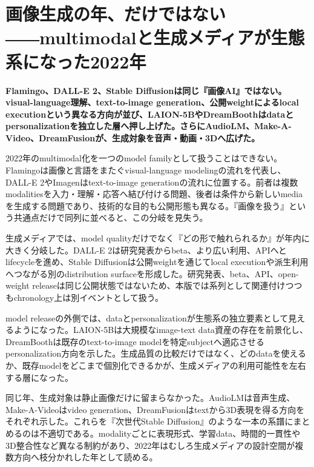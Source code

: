 \section{画像生成の年、だけではない――multimodalと生成メディアが生態系になった2022年}
\label{pkg:multimodal-media}
\noindent\textbf{Flamingo、DALL-E 2、Stable Diffusionは同じ『画像AI』ではない。visual-language理解、text-to-image generation、公開weightによるlocal executionという異なる方向が並び、LAION-5BやDreamBoothはdataとpersonalizationを独立した層へ押し上げた。さらにAudioLM、Make-A-Video、DreamFusionが、生成対象を音声・動画・3Dへ広げた。}\autocite{src-13aed13ff36c,src-16a1a1dc486e,src-26aadbc0393f,src-27297a80fac0,src-2832ee43ab8f,src-2c38d2f354fa,src-86ce6205a4ed,src-929080260e16,src-c5c7eddb6cf6,src-e0a494dc6724}

2022年のmultimodal化を一つのmodel familyとして扱うことはできない。Flamingoは画像と言語をまたぐvisual-language modelingの流れを代表し、DALL-E 2やImagenはtext-to-image generationの流れに位置する。前者は複数modalitiesを入力・理解・応答へ結び付ける問題、後者は条件から新しいmediaを生成する問題であり、技術的な目的も公開形態も異なる。『画像を扱う』という共通点だけで同列に並べると、この分岐を見失う。\autocite{src-13aed13ff36c,src-16a1a1dc486e,src-27297a80fac0,src-2c38d2f354fa,src-86ce6205a4ed,src-929080260e16,src-c5c7eddb6cf6,src-cf669aed6653}


生成メディアでは、model qualityだけでなく『どの形で触れられるか』が年内に大きく分岐した。DALL-E 2は研究発表からbeta、より広い利用、APIへとlifecycleを進め、Stable Diffusionは公開weightを通じてlocal executionや派生利用へつながる別のdistribution surfaceを形成した。研究発表、beta、API、open-weight releaseは同じ公開状態ではないため、本版では系列として関連付けつつもchronology上は別イベントとして扱う。\autocite{src-16a1a1dc486e,src-26aadbc0393f,src-27297a80fac0,src-2832ee43ab8f,src-2c38d2f354fa,src-86ce6205a4ed,src-929080260e16}


model releaseの外側では、dataとpersonalizationが生態系の独立要素として見えるようになった。LAION-5Bは大規模なimage-text data資産の存在を前景化し、DreamBoothは既存のtext-to-image modelを特定subjectへ適応させるpersonalization方向を示した。生成品質の比較だけではなく、どのdataを使えるか、既存modelをどこまで個別化できるかが、生成メディアの利用可能性を左右する層になった。\autocite{src-26aadbc0393f,src-2832ee43ab8f,src-76875f66d5f3,src-e0a494dc6724}


同じ年、生成対象は静止画像だけに留まらなかった。AudioLMは音声生成、Make-A-Videoはvideo generation、DreamFusionはtextから3D表現を得る方向をそれぞれ示した。これらを『次世代Stable Diffusion』のような一本の系譜にまとめるのは不適切である。modalityごとに表現形式、学習data、時間的一貫性や3D整合性など異なる制約があり、2022年はむしろ生成メディアの設計空間が複数方向へ枝分かれした年として読める。\autocite{src-1b692f6d18b5,src-b2dbb3098853,src-c19139f0be76}


